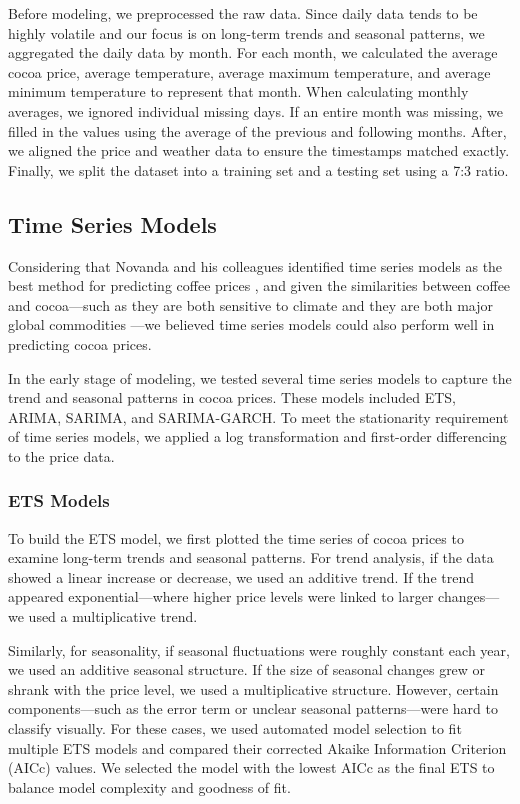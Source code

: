 \documentclass[10pt]{article}
\begin{document}
\noindent
Before modeling, we preprocessed the raw data. Since daily data tends to be highly volatile and our focus is on long-term trends and seasonal patterns, we aggregated the daily data by month. For each month, we calculated the average cocoa price, average temperature, average maximum temperature, and average minimum temperature to represent that month. When calculating monthly averages, we ignored individual missing days. If an entire month was missing, we filled in the values using the average of the previous and following months. After, we aligned the price and weather data to ensure the timestamps matched exactly. Finally, we split the dataset into a training set and a testing set using a 7:3 ratio.

\subsection{Time Series Models}
Considering that Novanda and his colleagues identified time series models as the best method for predicting coffee prices \cite{bestmodelcoffee}, and given the similarities between coffee and cocoa—such as they are both sensitive to climate and they are both major global commodities \cite{coffclim}—we believed time series models could also perform well in predicting cocoa prices.

\noindent
In the early stage of modeling, we tested several time series models to capture the trend and seasonal patterns in cocoa prices. These models included ETS, ARIMA, SARIMA, and SARIMA-GARCH. To meet the stationarity requirement of time series models, we applied a log transformation and first-order differencing to the price data.

\subsubsection{ETS Models}
To build the ETS model, we first plotted the time series of cocoa prices to examine long-term trends and seasonal patterns. For trend analysis, if the data showed a linear increase or decrease, we used an additive trend. If the trend appeared exponential—where higher price levels were linked to larger changes—we used a multiplicative trend.

\noindent
Similarly, for seasonality, if seasonal fluctuations were roughly constant each year, we used an additive seasonal structure. If the size of seasonal changes grew or shrank with the price level, we used a multiplicative structure. However, certain components—such as the error term or unclear seasonal patterns—were hard to classify visually. For these cases, we used automated model selection to fit multiple ETS models and compared their corrected Akaike Information Criterion (AICc) values. We selected the model with the lowest AICc as the final ETS to balance model complexity and goodness of fit.
\end{document}
